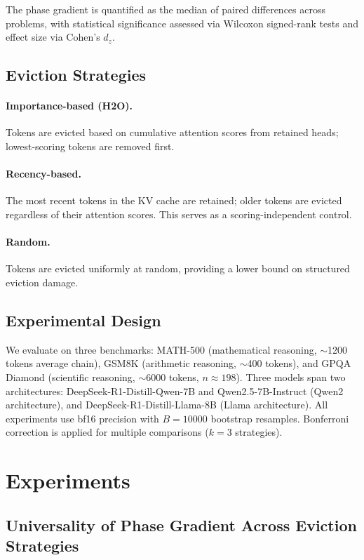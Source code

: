 \documentclass[11pt]{article}
\begin{document}
The phase gradient is quantified as the median of paired differences across problems, with statistical significance assessed via Wilcoxon signed-rank tests and effect size via Cohen's $d_z$.

\subsection{Eviction Strategies}

\paragraph{Importance-based (H2O).} Tokens are evicted based on cumulative attention scores from retained heads; lowest-scoring tokens are removed first.

\paragraph{Recency-based.} The most recent tokens in the KV cache are retained; older tokens are evicted regardless of their attention scores. This serves as a scoring-independent control.

\paragraph{Random.} Tokens are evicted uniformly at random, providing a lower bound on structured eviction damage.

\subsection{Experimental Design}

We evaluate on three benchmarks: MATH-500 (mathematical reasoning, $\sim$1200 tokens average chain), GSM8K (arithmetic reasoning, $\sim$400 tokens), and GPQA Diamond (scientific reasoning, $\sim$6000 tokens, $n \approx 198$). Three models span two architectures: DeepSeek-R1-Distill-Qwen-7B and Qwen2.5-7B-Instruct (Qwen2 architecture), and DeepSeek-R1-Distill-Llama-8B (Llama architecture). All experiments use bf16 precision with $B=10000$ bootstrap resamples. Bonferroni correction is applied for multiple comparisons ($k=3$ strategies).

\section{Experiments}

\subsection{Universality of Phase Gradient Across Eviction Strategies}
\end{document}
